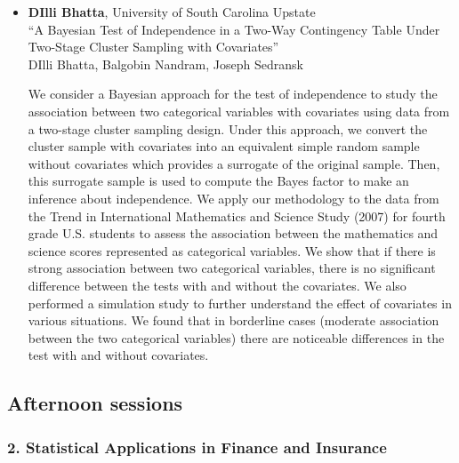\begin{itemize}
\item \textbf{DIlli Bhatta}, University of South Carolina Upstate \\
``A Bayesian Test of Independence in a Two-Way  Contingency Table  Under Two-Stage Cluster Sampling with Covariates'' \\
DIlli Bhatta, Balgobin Nandram, Joseph Sedransk


We consider a Bayesian approach for the test of independence to study the association between two categorical variables with covariates using data from a two-stage cluster sampling design. Under this approach, we convert the cluster sample with covariates into an equivalent simple random sample without covariates which provides a surrogate of the original sample. Then, this surrogate sample is used to compute the Bayes factor to make an inference about independence.
We apply our methodology to the data from the Trend in International Mathematics and Science Study (2007) for fourth grade U.S. students to assess the association between the mathematics and science scores represented as categorical variables. 
We show that if there is strong association between two categorical variables, there is no significant difference between the tests with and without the covariates. We also performed a simulation study to further understand the effect of covariates in various situations. We found that in borderline cases (moderate association between the two categorical variables) there are noticeable differences in the test with and without covariates. 

\end{itemize}

\subsection*{Afternoon sessions}

\subsubsection*{2. Statistical Applications in Finance and Insurance}

